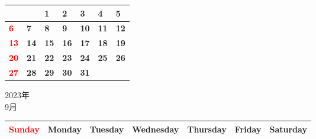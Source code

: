 \documentclass[a4paper,landscape]{jsarticle}
\newcommand{\dig}{\hspace{29mm}}
\newcommand{\tdig}{\hspace{27mm}}
\newcommand{\LBF}{\LARGE\textbf}
\begin{document}
\begingroup
\renewcommand{\arraystretch}{4}
\begin{tabular}{|p{32mm}|p{32mm}|p{32mm}|p{32mm}|p{32mm}|p{32mm}|p{32mm}|}
\hline
&&\raisebox{30pt} {\dig\LBF{1}}&\raisebox{30pt} {\dig\LBF{2}}&\raisebox{30pt} {\dig\LBF{3}}&\raisebox{30pt} {\dig\LBF{4}}&\raisebox{30pt} {\dig\LBF{5}}\\
\hline
\raisebox{30pt} {\dig\textcolor{red}{\LBF{6}}}&\raisebox{30pt} {\dig\LBF{7}}&\raisebox{30pt} {\dig\LBF{8}}&\raisebox{30pt} {\dig\LBF{9}}&\raisebox{30pt} {\tdig\LBF{10}}&\raisebox{30pt} {\tdig\LBF{11}}&\raisebox{30pt} {\tdig\LBF{12}}\\
\hline
\raisebox{30pt} {\tdig\textcolor{red}{\LBF{13}}}&\raisebox{30pt} {\tdig\LBF{14}}&\raisebox{30pt} {\tdig\LBF{15}}&\raisebox{30pt} {\tdig\LBF{16}}&\raisebox{30pt} {\tdig\LBF{17}}&\raisebox{30pt} {\tdig\LBF{18}}&\raisebox{30pt} {\tdig\LBF{19}}\\
\hline
\raisebox{30pt} {\tdig\textcolor{red}{\LBF{20}}}&\raisebox{30pt} {\tdig\LBF{21}}&\raisebox{30pt} {\tdig\LBF{22}}&\raisebox{30pt} {\tdig\LBF{23}}&\raisebox{30pt} {\tdig\LBF{24}}&\raisebox{30pt} {\tdig\LBF{25}}&\raisebox{30pt} {\tdig\LBF{26}}\\
\hline
\raisebox{30pt} {\tdig\textcolor{red}{\LBF{27}}}&\raisebox{30pt} {\tdig\LBF{28}}&\raisebox{30pt} {\tdig\LBF{29}}&\raisebox{30pt} {\tdig\LBF{30}}&\raisebox{30pt} {\tdig\LBF{31}}&&\\
\hline
\end{tabular}
\endgroup

\newpage

\begin{center}
	\LARGE 2023年\\
	\LARGE 9月
\end{center}

\begingroup
\renewcommand{\arraystretch}{1.4}
\begin{tabular}{|>{\centering\arraybackslash}p{32mm}|>{\centering\arraybackslash}p{32mm}|>{\centering\arraybackslash}p{32mm}|>{\centering\arraybackslash}p{32mm}|>{\centering\arraybackslash}p{32mm}|>{\centering\arraybackslash}p{32mm}|>{\centering\arraybackslash}p{32mm}|}
\hline
\textcolor{red}{\large Sunday}&\large Monday&\large Tuesday&\large Wednesday&\large Thursday&\large Friday&\large Saturday\\
\hline
\end{tabular}
\endgroup
\end{document}
